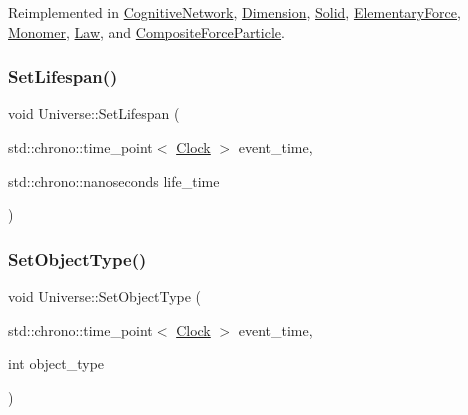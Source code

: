 Reimplemented in \mbox{\hyperlink{classCognitiveNetwork_af9f082a70f0cc25a3f818d9eace5a527}{Cognitive\+Network}}, \mbox{\hyperlink{classDimension_aeec6887382d09e3d78382582ff4e7c33}{Dimension}}, \mbox{\hyperlink{classSolid_ae237f2c713868c133e28ed7f75fc9125}{Solid}}, \mbox{\hyperlink{classElementaryForce_aa36d5875964f7e2fc981f6fc5431be7f}{Elementary\+Force}}, \mbox{\hyperlink{classMonomer_ab38d44b27a46d5630aeb5e889f927c09}{Monomer}}, \mbox{\hyperlink{classLaw_a908ccc2b0a561a7324a15393ec157219}{Law}}, and \mbox{\hyperlink{classCompositeForceParticle_ad9e1553ab0096230edd591e3135b223d}{Composite\+Force\+Particle}}.

\mbox{\label{classUniverse_ac3443dd59b61ae3110f07f681f63ed0a}} 
\subsubsection{\texorpdfstring{Set\+Lifespan()}{SetLifespan()}}
{\footnotesize\ttfamily void Universe\+::\+Set\+Lifespan (\begin{DoxyParamCaption}\item[{std\+::chrono\+::time\+\_\+point$<$ \mbox{\hyperlink{universe_8h_a0ef8d951d1ca5ab3cfaf7ab4c7a6fd80}{Clock}} $>$}]{event\+\_\+time,  }\item[{std\+::chrono\+::nanoseconds}]{life\+\_\+time }\end{DoxyParamCaption})}

\mbox{\label{classUniverse_a2274a54fbdc7504c897e4272162bf17a}} 
\subsubsection{\texorpdfstring{Set\+Object\+Type()}{SetObjectType()}}
{\footnotesize\ttfamily void Universe\+::\+Set\+Object\+Type (\begin{DoxyParamCaption}\item[{std\+::chrono\+::time\+\_\+point$<$ \mbox{\hyperlink{universe_8h_a0ef8d951d1ca5ab3cfaf7ab4c7a6fd80}{Clock}} $>$}]{event\+\_\+time,  }\item[{int}]{object\+\_\+type }\end{DoxyParamCaption})}

\mbox{\label{classUniverse_ae2ae1c3b3e4cde2c18f5f6a814761ec8}} 
